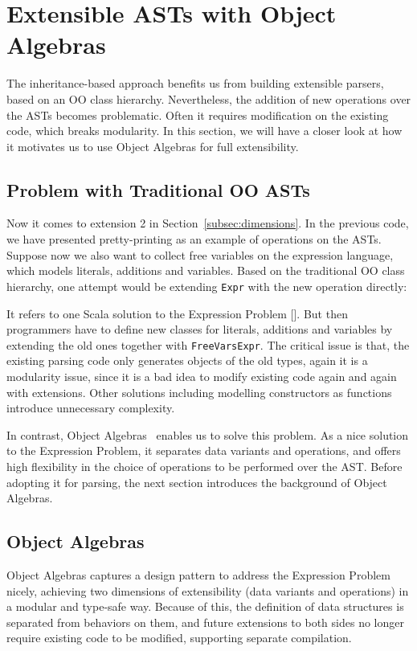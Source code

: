 \section{Extensible ASTs with Object Algebras}\label{sec:algebrasandparsing}

The inheritance-based approach benefits us from building extensible parsers, based on an OO class hierarchy.
Nevertheless, the addition of new operations over the ASTs becomes problematic. Often it requires modification on
the existing code, which breaks modularity. In this section, we will have a closer look at how it motivates us to
use Object Algebras for full extensibility.

\subsection{Problem with Traditional OO ASTs}\label{subsec:problemwithoutoa}

Now it comes to extension 2 in Section~\ref{subsec:dimensions}. In the previous code, we have presented pretty-printing as
an example of operations on the ASTs. Suppose now we also want to collect free variables on the expression language, which models
literals, additions and variables. Based on the traditional OO class hierarchy, one attempt would be extending \lstinline{Expr} with the new
operation directly:

It refers to one Scala solution to the Expression Problem []. But then programmers have to define new classes for literals, additions and variables
by extending the old ones together with \lstinline{FreeVarsExpr}. The critical issue is that, the existing parsing code only generates objects of the old
types, again it is a modularity issue, since it is a bad idea to modify existing code again and again with extensions. Other solutions including modelling constructors as functions introduce unnecessary complexity.

In contrast, Object Algebras~\cite{Oliveira2012} enables us to solve this problem. As a nice solution to the Expression Problem, it separates data variants
and operations, and offers high flexibility in the choice of operations to be performed over the AST. Before adopting it for parsing, the next section introduces the background of Object Algebras.

\subsection{Object Algebras}\label{subsec:objectalgebras}
Object Algebras captures a design pattern to address the Expression Problem nicely,
achieving two dimensions of extensibility (data variants and operations) in a modular and type-safe way.
Because of this, the definition of data structures is separated from behaviors on them, and future extensions
to both sides no longer require existing code to be modified, supporting separate compilation.

